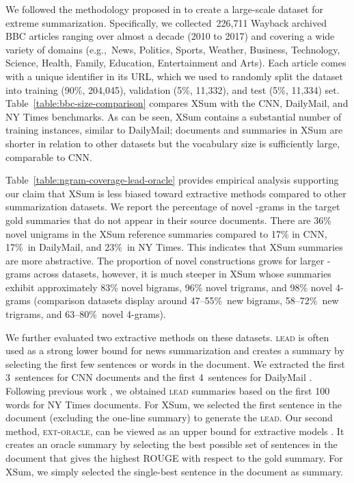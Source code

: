 \documentclass[11pt,a4paper]{article}
\begin{document}
We followed the methodology proposed in  to
create a large-scale dataset for extreme summarization. Specifically,
we collected~226,711 Wayback archived BBC articles ranging over almost
a decade (2010 to 2017) and covering a wide variety of domains
(e.g.,~News, Politics, Sports, Weather, Business, Technology, Science,
Health, Family, Education, Entertainment and Arts). Each article comes
with a unique identifier in its URL, which we used to randomly split
the dataset into training (90\%, 204,045), validation (5\%, 11,332),
and test (5\%, 11,334) set. Table~\ref{table:bbc-size-comparison}
compares XSum with the CNN, DailyMail, and NY Times benchmarks. As can be seen, XSum contains a substantial number of
training instances, similar to DailyMail; documents and summaries in
XSum are shorter in relation to other datasets but the vocabulary size
is sufficiently large, comparable to CNN.



Table~\ref{table:ngram-coverage-lead-oracle} provides empirical
analysis supporting our claim that XSum is less biased toward
extractive methods compared to other summarization datasets.  We
report the percentage of novel -grams in the target gold summaries
that do not appear in their source documents.  There are 36\% novel
unigrams in the XSum reference summaries compared to 17\% in CNN,
17\%~in DailyMail, and 23\%~in NY Times. This indicates that XSum summaries are more abstractive. The
proportion of novel constructions grows for larger -grams across
datasets, however, it is much steeper in XSum whose summaries exhibit
approximately 83\% novel bigrams, 96\% novel trigrams, and 98\% novel
4-grams (comparison datasets display around 47--55\%~new bigrams,
58--72\%~new trigrams, and 63--80\%~novel 4-grams).

We further evaluated two extractive methods on these datasets.
\textsc{lead} is often used as a strong lower bound for news
summarization \cite{nenkova-05} and creates a summary by selecting the
first few sentences or words in the document. We extracted the first
3~sentences for CNN documents and the first 4~sentences for DailyMail
\cite{narayan-rank18}. Following previous work
\cite{durrett-nyt-ext,paulus-socher-arxiv17}, we obtained
\textsc{lead} summaries based on the first 100 words for NY Times
documents. For XSum, we selected the first sentence
in the document (excluding the one-line summary) to generate the
\textsc{lead}. Our second method, \textsc{ext-oracle}, can be viewed
as an upper bound for extractive models
\cite{nallapati17,narayan-rank18}. It creates an oracle summary by
selecting the best possible set of sentences in the document that
gives the highest ROUGE \cite{rouge} with respect to the gold
summary. For XSum, we simply selected the single-best sentence in the
document as summary.
\end{document}

